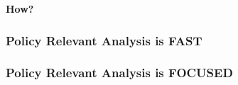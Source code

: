 \documentclass[12pt,handout]{beamer}
\begin{document}
\begin{frame}
\begin{center}
\Huge \textbf{How?}
\end{center}
\end{frame}

{
\begin{frame}[plain]
\frametitle{Policy Relevant Analysis is FAST}
\end{frame}
}

{
\begin{frame}[plain]
\frametitle{Policy Relevant Analysis is FOCUSED}
\end{frame}
}
\end{document}
